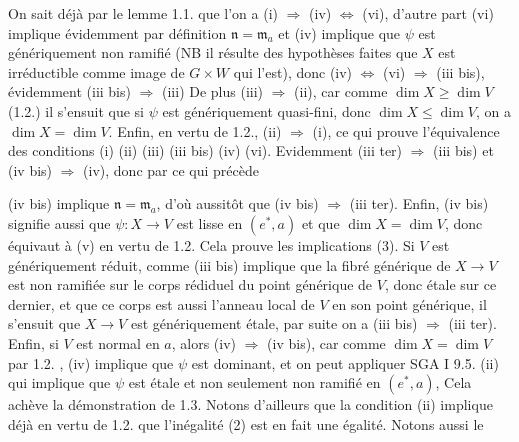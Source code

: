 \documentclass[11pt,a4paper]{article}
\begin{document}
On sait déjà par le lemme 1.1. que l'on a (i) $\Rightarrow$ (iv)
$\Leftrightarrow$ (vi), d'autre part (vi) implique évidemment par définition
$\mathfrak{n} = \mathfrak{m}_a$ et (iv) implique  que
$\psi$ est génériquement non ramifié (NB il résulte des hypothèses faites que
$X$ est irréductible comme image de $G \times W$ qui l'est), donc (iv)
$\Leftrightarrow$ (vi) $\Rightarrow$ (iii bis), évidemment (iii bis)
$\Rightarrow$ (iii) De plus (iii) $\Rightarrow$ (ii), car comme
$\dim X \geqslant \dim V$ (1.2.) il s'ensuit que si $\psi$ est génériquement
quasi-fini, donc $\dim X \leqslant \dim V$, on a
$\dim X = \dim V$. Enfin, en vertu de 1.2., (ii) $\Rightarrow$ (i), ce
qui prouve l'équivalence des conditions (i) (ii) (iii) (iii bis) (iv) (vi).
Evidemment (iii ter) $\Rightarrow$ (iii bis) et (iv bis) $\Rightarrow$ (iv),
donc par ce qui précède



(iv bis) implique $\mathfrak{n} = \mathfrak{m}_a$, d'où aussitôt que (iv bis)
$\Longrightarrow$ (iii ter). Enfin, (iv bis) signifie aussi que
$\psi : X \to V$ est lisse en $(e^{*}, a)$ et que $\dim X = \dim V$, donc
équivaut à (v) en vertu de 1.2. Cela prouve les implications (3). Si $V$ est
 génériquement réduit\struck{)}, comme (iii bis)
implique que la fibré générique de $X \to V$ est non ramifiée sur
le corps rédiduel du point générique de $V$, donc étale sur ce
dernier, et que ce corps est aussi l'anneau local de $V$ en son point
générique, il s'ensuit que $X \to V$ est génériquement étale,
 par suite on a (iii bis) $\Rightarrow$ (iii ter).
Enfin, si $V$ est normal en $a$, alors (iv) $\Longrightarrow$ (iv bis), car
comme $\dim X = \dim V$ par 1.2. , (iv) implique que $\psi$ est dominant, et
on peut appliquer SGA I 9.5. (ii) qui implique que $\psi$ est étale et non
seulement non ramifié en $(e^{*}, a)$,  Cela achève la
démonstration de 1.3. Notons d'ailleurs que la condition (ii) implique déjà
en vertu de 1.2. que l'inégalité (2) est en fait une égalité. Notons aussi le
\end{document}

